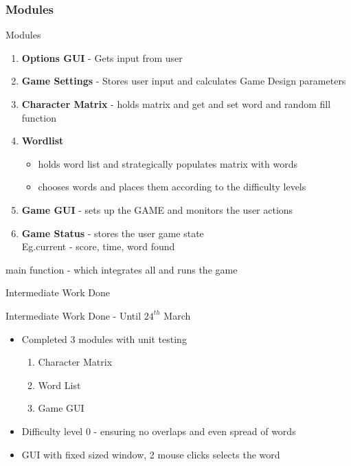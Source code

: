 \documentclass{beamer}
\begin{document}
\begin{frame}\frametitle {Modules}
\begin{block}{Modules}
\begin{enumerate} 
\item \textbf{Options GUI} - Gets input from user
\item \textbf{Game Settings} - Stores user input and calculates Game Design parameters 
\item \textbf{Character Matrix} - holds matrix and get and set word and random fill function
\item \textbf{Wordlist}
\begin{itemize} \item holds word list and strategically populates matrix with words  \item  chooses words and places them according to the difficulty levels \end{itemize}
\item \textbf{Game GUI} - sets up the GAME and monitors the user actions
\item \textbf{Game Status} - stores the user game state \\Eg.current - score, time, word found
\end{enumerate}
main function - which integrates all and runs the game
\end{block}
\end{frame}

\begin{frame}{Intermediate Work Done}

\begin{block}{Intermediate Work Done - Until $24^{th}$ March}
\begin{itemize}
\item Completed 3 modules with unit testing
\begin{enumerate}
\item Character Matrix
\item Word List 
\item Game GUI
\end{enumerate}
\item Difficulty level 0 - ensuring no overlaps and even spread of words
\item GUI with fixed sized window, 2 mouse clicks selects the word  
 \end{itemize}
\end{block}
\end{frame}
\end{document}
